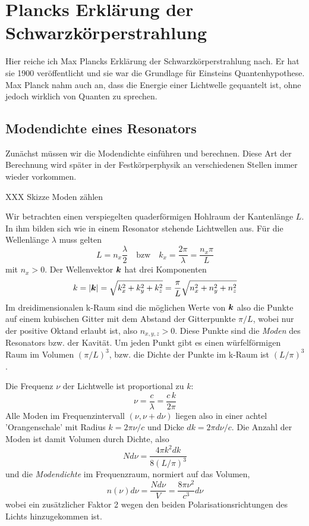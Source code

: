  \section{Plancks Erklärung der Schwarzkörperstrahlung}

Hier reiche ich Max Plancks Erklärung der Schwarzkörperstrahlung nach. Er hat sie 1900 veröffentlicht und sie war die Grundlage für Einsteins Quantenhypothese. Max Planck nahm auch an, dass die Energie einer Lichtwelle gequantelt ist, ohne jedoch wirklich von Quanten zu sprechen.

\subsection{Modendichte eines Resonators}

Zunächst müssen wir die Modendichte einführen und berechnen. Diese Art der Berechnung wird später in der Festkörperphysik an verschiedenen Stellen immer wieder vorkommen.


\begin{marginfigure}
    \caption{XXX Skizze Moden zählen}
   \end{marginfigure}


Wir betrachten einen verspiegelten quaderförmigen Hohlraum der Kantenlänge $L$. In ihm bilden sich wie in einem Resonator stehende Lichtwellen aus. Für die Wellenlänge $\lambda$ muss gelten
\begin{equation}
     L = n_x \frac{\lambda}{2} \quad \text{bzw} \quad k_x = \frac{2 \pi}{\lambda} = \frac{n_x \pi }{L}
\end{equation}
mit $n_x > 0$. Der Wellenvektor $\boldsymbol{k}$ hat drei Komponenten
\begin{equation}
    k = | \boldsymbol{k} | = \sqrt{k_x^2 + k_y^2 + k_z^2 } = \frac{\pi}{L} \sqrt{n_x^2 + n_y^2 + n_z^2}
\end{equation}
Im dreidimensionalen k-Raum sind die möglichen Werte von $\boldsymbol{k}$ also die Punkte auf einem kubischen Gitter mit dem Abstand der Gitterpunkte $\pi / L$, wobei nur der positive Oktand erlaubt ist, also $n_{x,y,z} > 0$. Diese Punkte sind die \emph{Moden} des Resonators bzw. der Kavität. Um jeden Punkt gibt es einen würfelförmigen Raum im Volumen $(\pi/L)^3$, bzw. die Dichte der Punkte im k-Raum ist $(L/\pi)^3$.

Die Frequenz $\nu$ der Lichtwelle ist proportional zu $k$:
\begin{equation}
    \nu = \frac{c}{\lambda} = \frac{c \, k}{2 \pi }
\end{equation}
Alle Moden  im  Frequenzintervall $(\nu, \nu+d\nu)$ liegen also in einer  achtel 'Orangenschale' mit Radius $k = 2 \pi \nu / c$  und Dicke $dk = 2 \pi d\nu / c$. Die Anzahl der Moden ist damit Volumen durch Dichte, also  
\begin{equation}
    N d\nu = \frac{4 \pi k^2 dk}{8 (L/\pi)^3} 
\end{equation}
und die \emph{Modendichte} im Frequenzraum, normiert auf das Volumen,
\begin{equation}
    n(\nu) d\nu = \frac{N d\nu}{V} = \frac{8 \pi \nu^2}{c^3} d\nu
\end{equation}
wobei ein zusätzlicher Faktor 2 wegen den beiden Polarisationsrichtungen des Lichts hinzugekommen ist.


